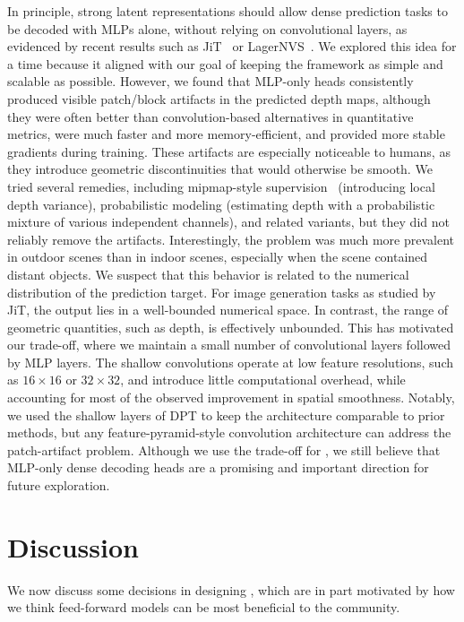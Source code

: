 In principle, strong latent representations should allow dense prediction tasks to be decoded with MLPs alone, without relying on convolutional layers, as evidenced by recent results such as JiT~\cite{li26back} or LagerNVS~\cite{szymanowicz26lagernvs}.
We explored this idea for a time because it aligned with our goal of keeping the framework as simple and scalable as possible.
However, we found that MLP-only heads consistently produced visible patch/block artifacts in the predicted depth maps, although they were often better than convolution-based alternatives in quantitative metrics, were much faster and more memory-efficient, and provided more stable gradients during training.
These artifacts are especially noticeable to humans, as they introduce geometric discontinuities that would otherwise be smooth.
We tried several remedies, including mipmap-style supervision~\cite{barron21mip-nerf:} (introducing local depth variance), probabilistic modeling (estimating depth with a probabilistic mixture of various independent channels),  and related variants, but they did not reliably remove the artifacts. 
Interestingly, the problem was much more prevalent in outdoor scenes than in indoor scenes, especially when the scene contained distant objects.
We suspect that this behavior is related to the numerical distribution of the prediction target.
For image generation tasks as studied by JiT, the output lies in a well-bounded numerical space.
In contrast, the range of geometric quantities, such as depth, is effectively unbounded.
This has motivated our trade-off, where we maintain a small number of convolutional layers followed by MLP layers.
The shallow convolutions operate at low feature resolutions, such as $16\times16$ or $32\times32$, and introduce little computational overhead, while accounting for most of the observed improvement in spatial smoothness. 
Notably, we used the shallow layers of DPT to keep the architecture comparable to prior methods, but any feature-pyramid-style convolution architecture can address the patch-artifact problem. 
Although we use the trade-off for \method, we still believe that MLP-only dense decoding heads are a promising and important direction for future exploration.

\section{Discussion}%
\label{sec:option}

We now discuss some decisions in designing \method, which are in part motivated by how we think feed-forward models can be most beneficial to the community.

